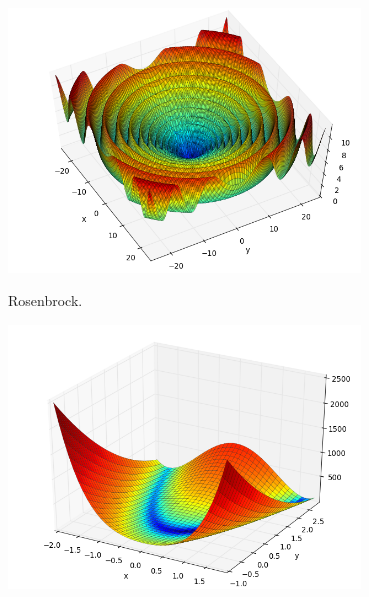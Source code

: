 \documentclass[mathserif]{beamer}
\begin{document}
\begin{frame}[allowframebreaks]
\begin{center}
        \includegraphics[height=7cm]{../figures/schaffer.png}
    \end{center}

    \begin{center}
        Rosenbrock.

        \includegraphics[height=7cm]{../figures/rosenbrock.png}
    \end{center}

\end{frame}
\end{document}
